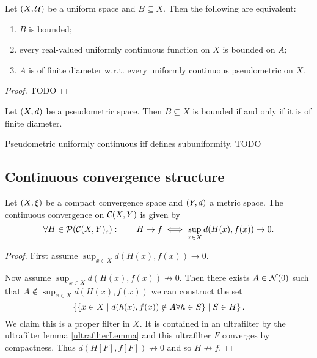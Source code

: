 \begin{proposition}
Let $\left( X, \mathcal{U} \right)$ be a uniform space and $B\subseteq X$. Then the following are equivalent:
\begin{enumerate}
\item $B$ is bounded;
\item every real-valued uniformly continuous function on $X$ is bounded on $A$;
\item $A$ is of finite diameter w.r.t. every uniformly continuous pseudometric on $X$.
\end{enumerate}
\end{proposition}
\begin{proof}
TODO
\end{proof}
\begin{corollary}
Let $\left( X,d \right)$ be a pseudometric space. Then $B\subseteq X$ is bounded \textup{if and only if} it is of finite diameter.
\end{corollary}
Pseudometric uniformly continuous iff defines subuniformity. TODO

\subsection{Continuous convergence structure}
\begin{proposition}
Let $\left( X,\xi \right)$ be a compact convergence space and $\left( Y,d \right)$ a metric space. The continuous convergence on $\operatorname{\mathcal{C}}(X,Y)$ is given by
\[ \forall H\in\operatorname{\mathcal{P}}(\operatorname{\mathcal{C}}(X,Y)_c): \qquad H\to f \iff \sup_{x\in X}d(H(x), f(x)) \to 0. \]
\end{proposition}
\begin{proof}
First assume $\sup_{x\in X}d(H(x), f(x)) \to 0$. 

Now assume $\sup_{x\in X}d(H(x), f(x)) \not\to 0$. Then there exists $A\in \operatorname{\mathcal{N}}(0)$ such that $A \notin \sup_{x\in X}d(H(x), f(x))$ we can construct the set
\[ \left\{ \left\{ x\in X \;\middle|\; d(h(x), f(x)) \notin A \forall h\in S \right\} \;\middle|\; S\in H \right\}. \]
We claim this is a proper filter in $X$. It is contained in an ultrafilter by the ultrafilter lemma \ref{ultrafilterLemma} and this ultrafilter $F$ converges by compactness. Thus $d(H[F], f[F]) \not\to 0$ and so $H\not\to f$.
\end{proof}


